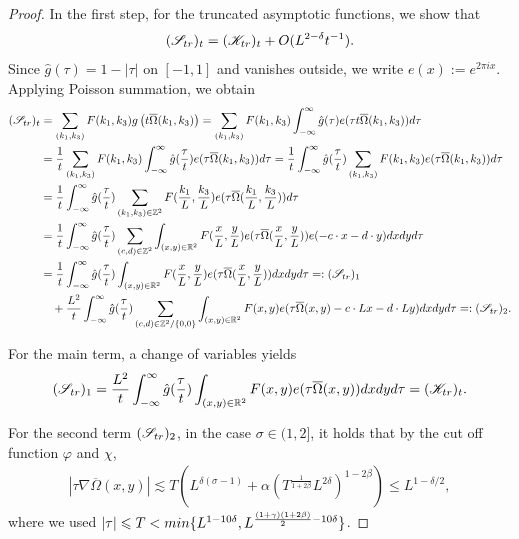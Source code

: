\documentclass[10pt,a4paper]{amsart}
\def\dif{{\mathord{{\rm d}}}}
\def\leq{\leqslant}
\def\min{{\mathord{{\rm min}}}}
\begin{document}
\begin{proof}
In the first step,  for  the truncated asymptotic functions, we show that $$
( \mathscr S_{\rm tr})_t= (\mathscr K_{\rm tr})_t +O(L^{2-\delta} t^{-1}).
$$
Since $\widehat g(\tau)=1-|\tau|$ on $[-1,1]$ and vanishes outside, we write $e(x):=e^{2\pi i x}$. Applying Poisson summation, we obtain 
\begin{align*}
 (  \mathscr S_{\rm tr})_t&=\sum_{(k_1, k_3)}F(k_1,k_3) g\left(t\overline \Omega(k_1,k_3)\right)=\sum_{(k_1, k_3)}F(k_1,k_3)\int_{-\infty}^{\infty}\hat{g}(\tau)e(\tau t\overline \Omega(k_1,k_3))\dif \tau\\
 &=\frac1t \sum_{(k_1, k_3)}F(k_1,k_3)\int_{-\infty}^{\infty}\hat{g}(\frac\tau t)e(\tau \overline \Omega(k_1,k_3))\dif \tau=\frac1t \int_{-\infty}^{\infty}\hat{g}(\frac\tau t)\sum_{(k_1, k_3)}F(k_1,k_3)e(\tau \overline \Omega(k_1,k_3))\dif \tau\\
 &=\frac1t \int_{-\infty}^{\infty}\hat{g}(\frac\tau t)\sum_{(k_1, k_3)\in\mathbb{Z}^{2}}F(\frac{k_1}{L},\frac{k_3}L)e(\tau \overline \Omega(\frac{k_1}L,\frac{k_3}L))\dif \tau\\
 &=\frac1t \int_{-\infty}^{\infty}\hat{g}(\frac\tau t) \sum_{(c,d)\in\mathbb{Z}^{2}}\int_{(x,y)\in\mathbb{R}^{2}}F(\frac{x}{L},\frac{y}L)e(\tau \overline \Omega(\frac{x}L,\frac{y}L))e(-c\cdot x-d\cdot y) \dif x\dif y\dif \tau\\
  &=\frac1t \int_{-\infty}^{\infty}\hat{g}(\frac\tau t) \int_{(x,y)\in\mathbb{R}^{2}}F(\frac{x}{L},\frac{y}L)e(\tau \overline \Omega(\frac{x}L,\frac{y}L))\dif x\dif y\dif \tau=:  (\mathscr S_{\rm tr})_1\\
   &\quad+\frac{L^{2}}t \int_{-\infty}^{\infty}\hat{g}(\frac\tau t) \sum_{(c,d)\in\mathbb{Z}^{2}/\{0,0\}}\int_{(x,y)\in\mathbb{R}^{2}}F(x,y)e(\tau \overline \Omega(x,y)-c\cdot Lx-d\cdot Ly) \dif x\dif y\dif \tau=:  (\mathscr S_{\rm tr})_2.
\end{align*}

For the main term, a change of variables yields
\begin{align*}
  ( \mathscr S_{\rm tr})_1=\frac{L^{2}}t \int_{-\infty}^{\infty}\hat{g}(\frac\tau t) \int_{(x,y)\in\mathbb{R}^{2}}F(x,y)e(\tau \overline \Omega(x,y))\dif x\dif y\dif \tau= (\mathscr K_{\rm tr})_t.
\end{align*}

For the second term $(\mathscr S_{\rm tr})_2$, in the case $\sigma\in(1,2]$, it holds that by the cut off function $\varphi$ and $\chi$,
\begin{align*}
   |\tau  \nabla  \overline \Omega(x,y)|\lesssim T(L^{\delta(\sigma-1)}+\alpha (T^{\frac{1}{1+2\beta}}L^{2\delta})^{1-2\beta})\leq L^{1-\delta/2},
\end{align*}
where we used $|\tau|\leq T < \min\{L^{1-10\delta},L^{\frac{(1+\gamma)(1+2\beta)}{2}-10\delta}\}$.


\end{proof}
\end{document}
